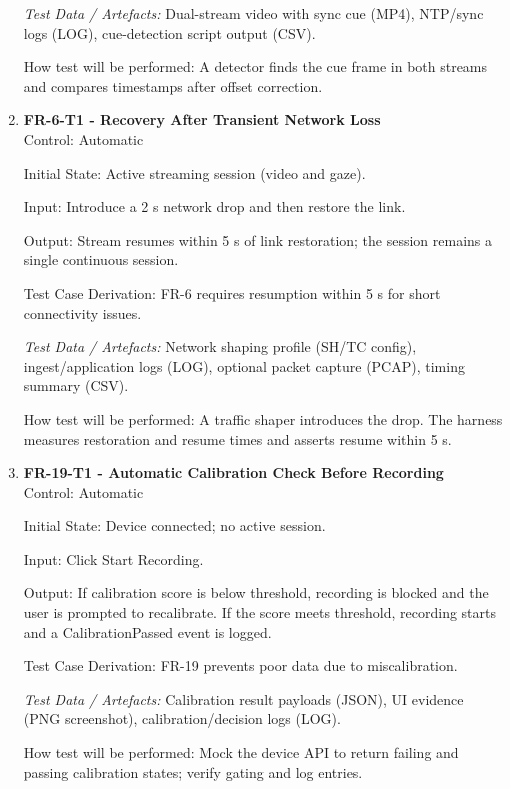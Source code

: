 \documentclass[12pt, titlepage]{article}
\begin{document}
\begin{enumerate}
\textit{Test Data / Artefacts:} Dual-stream video with sync cue (MP4), NTP/sync logs (LOG), cue-detection script output (CSV).

How test will be performed: A detector finds the cue frame in both streams and compares timestamps after offset correction.

\item \textbf{FR-6-T1 - Recovery After Transient Network Loss} \\

Control: Automatic

Initial State: Active streaming session (video and gaze).

Input: Introduce a 2 s network drop and then restore the link.

Output: Stream resumes within 5 s of link restoration; the session remains a single continuous session.

Test Case Derivation: FR-6 requires resumption within 5 s for short connectivity issues.

\textit{Test Data / Artefacts:} Network shaping profile (SH/TC config), ingest/application logs (LOG), optional packet capture (PCAP), timing summary (CSV).

How test will be performed: A traffic shaper introduces the drop. The harness measures restoration and resume times and asserts resume within 5 s.

\item \textbf{FR-19-T1 - Automatic Calibration Check Before Recording} \\

Control: Automatic

Initial State: Device connected; no active session.

Input: Click Start Recording.

Output: If calibration score is below threshold, recording is blocked and the user is prompted to recalibrate. If the score meets threshold, recording starts and a CalibrationPassed event is logged.

Test Case Derivation: FR-19 prevents poor data due to miscalibration.

\textit{Test Data / Artefacts:} Calibration result payloads (JSON), UI evidence (PNG screenshot), calibration/decision logs (LOG).

How test will be performed: Mock the device API to return failing and passing calibration states; verify gating and log entries.

\end{enumerate}
\end{document}
